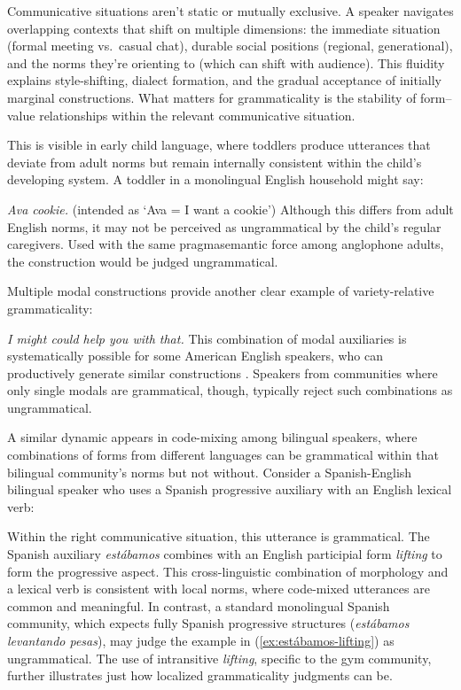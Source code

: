 \documentclass[12pt,letterpaper]{article}
\newcommand{\mention}[1]{\textit{#1}}
\newcommand{\olang}[1]{\textit{#1}}
\begin{document}
Communicative situations aren't static or mutually exclusive. A speaker navigates overlapping contexts that shift on multiple dimensions: the immediate situation (formal meeting vs.\ casual chat), durable social positions (regional, generational), and the norms they're orienting to (which can shift with audience). This fluidity explains style-shifting, dialect formation, and the gradual acceptance of initially marginal constructions. What matters for grammaticality is the stability of form--value relationships within the relevant communicative situation.

This is visible in early child language, where toddlers produce utterances that deviate from adult norms but remain internally consistent within the child's developing system. A toddler in a monolingual English household might say:

\ea
\mention{Ava cookie.} (intended as `Ava = I want a cookie')
\z
Although this differs from adult English norms, it may not be perceived as ungrammatical by the child's regular caregivers. Used with the same pragmasemantic force among anglophone adults, the construction would be judged ungrammatical.

Multiple modal constructions provide another clear example of variety-relative grammaticality:

\ea
\mention{I might could help you with that.}
\z
This combination of modal auxiliaries is systematically possible for some American English speakers, who can productively generate similar constructions \autocite{morin2024semantics}. Speakers from communities where only single modals are grammatical, though, typically reject such combinations as ungrammatical.

A similar dynamic appears in code-mixing among bilingual speakers, where combinations of forms from different languages can be grammatical within that bilingual community's norms but not without. Consider a Spanish-English bilingual speaker who uses a Spanish progressive auxiliary with an English lexical verb:

 \label{ex:estábamos-lifting}
\z
Within the right communicative situation, this utterance is grammatical. The Spanish auxiliary \olang{estábamos} combines with an English participial form \mention{lifting} to form the progressive aspect. This cross-linguistic combination of morphology and a lexical verb is consistent with local norms, where code-mixed utterances are common and meaningful. In contrast, a standard monolingual Spanish community, which expects fully Spanish progressive structures (\olang{estábamos levantando pesas}), may judge the example in (\ref{ex:estábamos-lifting}) as ungrammatical. The use of intransitive \mention{lifting}, specific to the gym community, further illustrates just how localized grammaticality judgments can be.
\end{document}
